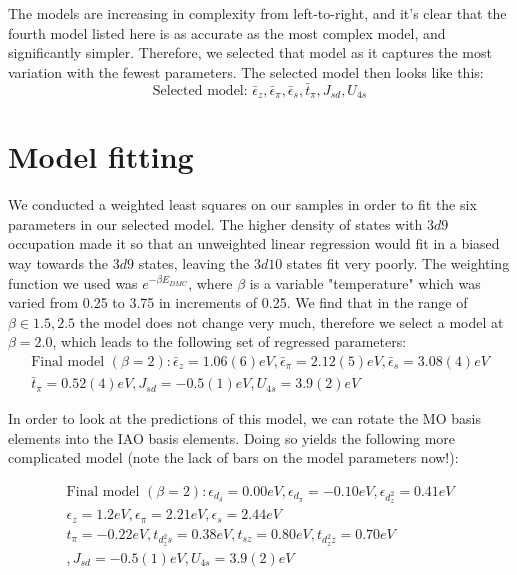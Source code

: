 \documentclass{article}
\begin{document}
The models are increasing in complexity from left-to-right, and it's clear that the fourth model listed here is as accurate as the most complex model, and significantly simpler. Therefore, we selected that model as it captures the most variation with the fewest parameters. The selected model then looks like this: 
$$ \boxed{\text{Selected model: }\bar{\epsilon}_z, \bar{\epsilon}_\pi, \bar{\epsilon}_s, \bar{t}_\pi, J_{sd}, U_{4s}}$$

\section{Model fitting}
We conducted a weighted least squares on our samples in order to fit the six parameters in our selected model. The higher density of states with $3d9$ occupation made it so that an unweighted linear regression would fit in a biased way towards the $3d9$ states, leaving the $3d10$ states fit very poorly. The weighting function we used was $e^{-\beta E_{DMC}}$, where $\beta$ is a variable "temperature" which was varied from 0.25 to 3.75 in increments of 0.25. We find that in the range of $\beta \in {1.5, 2.5}$ the model does not change very much, therefore we select a model at $\beta = 2.0$, which leads to the following set of regressed parameters:
\begin{multline}
 \boxed{\text{Final model }  (\beta=2): \bar{\epsilon}_z = 1.06(6) eV, \bar{\epsilon}_\pi = 2.12(5) eV, \bar{\epsilon}_s = 3.08(4) eV}\\
\boxed{\bar{t}_\pi = 0.52(4) eV, J_{sd} = -0.5(1) eV, U_{4s} = 3.9(2) eV}
\end{multline}

In order to look at the predictions of this model, we can rotate the MO basis elements into the IAO basis elements. Doing so yields the following more complicated model (note the lack of bars on the model parameters now!):

\begin{multline}
 \boxed{\text{Final model }  (\beta=2): \epsilon_{d_\delta} = 0.00 eV, \epsilon_{d_\pi} = -0.10 eV, \epsilon_{d_z^2} = 0.41 eV }\\
 \boxed{\epsilon_z = 1.2 eV, \epsilon_\pi = 2.21 eV, \epsilon_s = 2.44 eV}\\
\boxed{t_\pi = -0.22 eV, t_{d_z^2 s} = 0.38 eV, t_{s z} = 0.80 eV, t_{d_z^2 z} = 0.70 eV}\\
\boxed{ , J_{sd} = -0.5(1) eV, U_{4s} = 3.9(2) eV}
\end{multline}
\end{document}
